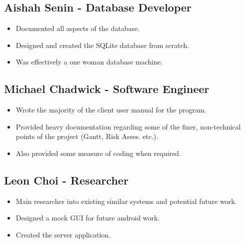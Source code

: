 \subsection{Aishah Senin - Database Developer}
\begin{itemize}
\item Documented all aspects of the database.
\item Designed and created the SQLite database from scratch.
\item Was effectively a one woman database machine.
\end{itemize}

\subsection{Michael Chadwick - Software Engineer}
\begin{itemize}
\item Wrote the majority of the client user manual for the program.
\item Provided heavy documentation regarding some of the finer, non-technical
points of the project (Gantt, Risk Asses. etc.).
\item Also provided some measure of coding when required.
\end{itemize}

\subsection{Leon Choi - Researcher}
\begin{itemize}
\item Main researcher into existing similar systems and potential future work.
\item Designed a mock GUI for future android work.
\item Created the server application.
\end{itemize}
